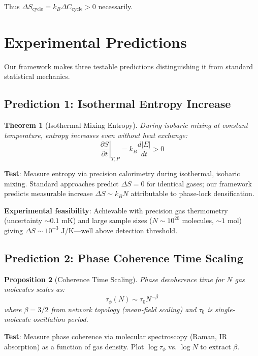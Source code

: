 \documentclass[twocolumn,superscriptaddress,prb,10pt]{revtex4-2}
\newtheorem{theorem}{Theorem}
\newtheorem{proposition}[theorem]{Proposition}
\theoremstyle{definition}
\theoremstyle{remark}
\begin{document}
Thus $\Delta S_{\text{cycle}} = k_B \Delta C_{\text{cycle}} > 0$ necessarily.

\section{Experimental Predictions}
\label{sec:predictions}

Our framework makes three testable predictions distinguishing it from standard statistical mechanics.

\subsection{Prediction 1: Isothermal Entropy Increase}

\begin{theorem}[Isothermal Mixing Entropy]
During isobaric mixing at constant temperature, entropy increases even without heat exchange:
\begin{equation}
\left.\frac{\partial S}{\partial t}\right|_{T,P} = k_B \frac{d|E|}{dt} > 0
\end{equation}
\end{theorem}

\textbf{Test}: Measure entropy via precision calorimetry during isothermal, isobaric mixing. Standard approaches predict $\Delta S = 0$ for identical gases; our framework predicts measurable increase $\Delta S \sim k_B N$ attributable to phase-lock densification.

\textbf{Experimental feasibility}: Achievable with precision gas thermometry (uncertainty $\sim 0.1$ mK) and large sample sizes ($N \sim 10^{20}$ molecules, $\sim 1$ mol) giving $\Delta S \sim 10^{-3}$ J/K—well above detection threshold.

\subsection{Prediction 2: Phase Coherence Time Scaling}

\begin{proposition}[Coherence Time Scaling]
Phase decoherence time for $N$ gas molecules scales as:
\begin{equation}
\tau_{\phi}(N) \sim \tau_0 N^{-\beta}
\end{equation}
where $\beta = 3/2$ from network topology (mean-field scaling) and $\tau_0$ is single-molecule oscillation period.
\end{proposition}

\textbf{Test}: Measure phase coherence via molecular spectroscopy (Raman, IR absorption) as a function of gas density. Plot $\log \tau_{\phi}$ vs. $\log N$ to extract $\beta$.
\end{document}
